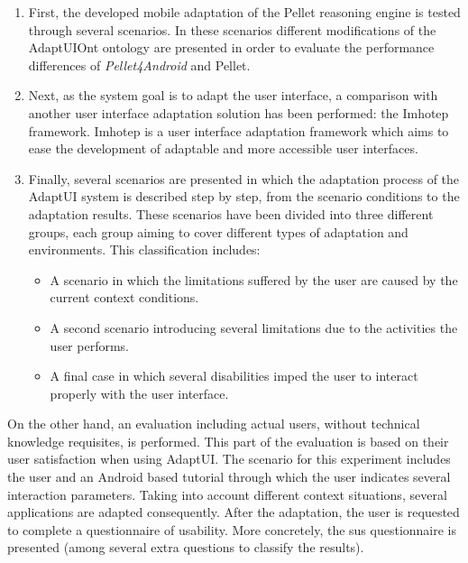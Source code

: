 \begin{enumerate}[label=\alph*)]
  \item First, the developed mobile adaptation of the Pellet reasoning engine 
  is tested through several scenarios. In these scenarios different   
  modifications of the AdaptUIOnt ontology are presented in order to evaluate 
  the performance differences of \textit{Pellet4Android} and Pellet.
  
  \item Next, as the system goal is to adapt the user interface, a comparison 
  with another user interface adaptation solution has been performed: the 
  Imhotep framework. Imhotep is a user interface adaptation framework which 
  aims to ease the development of adaptable and more accessible user 
  interfaces.
  
  \item Finally, several scenarios are presented in which the adaptation process
  of the AdaptUI system is described step by step, from the scenario conditions
  to the adaptation results. These scenarios have been divided into three 
  different groups, each group aiming to cover different types of adaptation 
  and environments. This classification includes:
  \begin{itemize}
    \item A scenario in which the limitations suffered by the user are caused
    by the current context conditions. 
    
    \item A second scenario introducing several limitations due to the  
    activities the user performs.
    
    \item A final case in which several disabilities imped the user to interact 
    properly with the user interface.
  \end{itemize}
\end{enumerate}

On the other hand, an evaluation including actual users, without technical knowledge
requisites, is performed. This part of the evaluation is based on their user
satisfaction when using AdaptUI. The scenario for this experiment includes the
user and an Android based tutorial through which the user indicates several 
interaction parameters. Taking into account different context situations, several 
applications are adapted consequently. After the adaptation, the user is 
requested to complete a questionnaire of usability. More concretely, the \ac{sus} 
questionnaire is presented (among several extra questions to classify the 
results).

